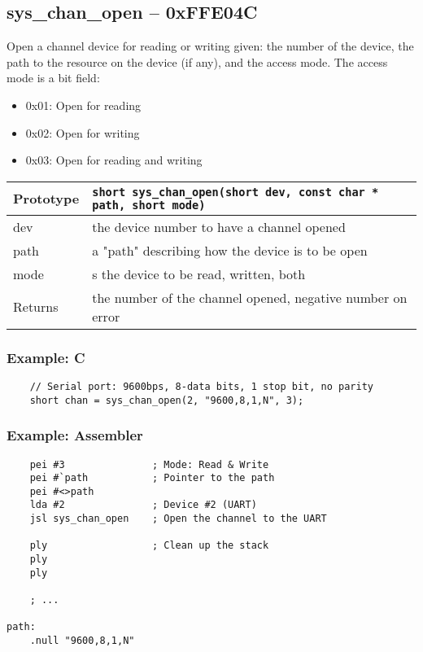 \subsection*{sys\_chan\_open -- 0xFFE04C}
Open a channel device for reading or writing given: the number of the device, the path to the resource on the device (if any), and the access mode.
The access mode is a bit field:
\begin{itemize}
    \item 0x01: Open for reading
    \item 0x02: Open for writing
    \item 0x03: Open for reading and writing
\end{itemize}

\bigskip

\begin{tabular}{|l||l|} \hline
Prototype & \lstinline!short sys_chan_open(short dev, const char * path, short mode)! \\ \hline
dev & the device number to have a channel opened \\ \hline
path & a "path" describing how the device is to be open \\ \hline
mode & s the device to be read, written, both\\ \hline
Returns & the number of the channel opened, negative number on error \\ \hline
\end{tabular}

\subsubsection*{Example: C}
\begin{lstlisting}
    // Serial port: 9600bps, 8-data bits, 1 stop bit, no parity
    short chan = sys_chan_open(2, "9600,8,1,N", 3);    
\end{lstlisting}

\subsubsection*{Example: Assembler}
\begin{verbatim}
    pei #3               ; Mode: Read & Write
    pei #`path           ; Pointer to the path
    pei #<>path
    lda #2               ; Device #2 (UART)
    jsl sys_chan_open    ; Open the channel to the UART

    ply                  ; Clean up the stack
    ply
    ply

    ; ...

path:
    .null "9600,8,1,N"
\end{verbatim}


